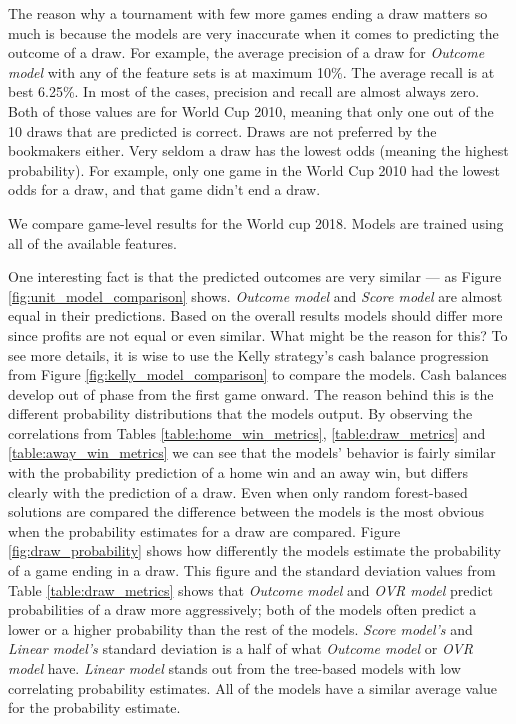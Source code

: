 The reason why a tournament with few more games ending a draw matters so much is because the models are very inaccurate when it comes to predicting the outcome of a draw. For example, the average precision of a draw for \textit{Outcome model} with any of the feature sets is at maximum 10\%. The average recall is at best 6.25\%. In most of the cases, precision and recall are almost always zero. Both of those values are for World Cup 2010, meaning that only one out of the 10 draws that are predicted is correct. Draws are not preferred by the bookmakers either. Very seldom a draw has the lowest odds (meaning the highest probability). For example, only one game in the World Cup 2010 had the lowest odds for a draw, and that game didn't end a draw.

We compare game-level results for the World cup 2018. Models are trained using all of the available features.

One interesting fact is that the predicted outcomes are very similar --- as Figure \ref{fig:unit_model_comparison} shows. \textit{Outcome model} and \textit{Score model} are almost equal in their predictions. Based on the overall results models should differ more since profits are not equal or even similar. What might be the reason for this? To see more details, it is wise to use the Kelly strategy's cash balance progression from Figure \ref{fig:kelly_model_comparison} to compare the models. Cash balances develop out of phase from the first game onward. The reason behind this is the different probability distributions that the models output. By observing the correlations from Tables \ref{table:home_win_metrics}, \ref{table:draw_metrics} and \ref{table:away_win_metrics} we can see that the models' behavior is fairly similar with the probability prediction of a home win and an away win, but differs clearly with the prediction of a draw. Even when only random forest-based solutions are compared the difference between the models is the most obvious when the probability estimates for a draw are compared. Figure \ref{fig:draw_probability} shows how differently the models estimate the probability of a game ending in a draw. This figure and the standard deviation values from Table \ref{table:draw_metrics} shows that \textit{Outcome model} and \textit{OVR model} predict probabilities of a draw more aggressively; both of the models often predict a lower or a higher probability than the rest of the models. \textit{Score model's} and \textit{Linear model's} standard deviation is a half of what \textit{Outcome model} or \textit{OVR model} have. \textit{Linear model} stands out from the tree-based models with low correlating probability estimates. All of the models have a similar average value for the probability estimate.

